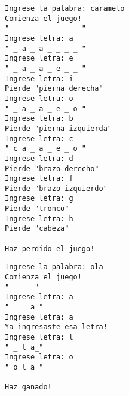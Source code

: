 \begin{lstlisting}
Ingrese la palabra: caramelo
Comienza el juego!
" _ _ _ _ _ _ _ _ "
Ingrese letra: a
" _ a _ a _ _ _ _ "
Ingrese letra: e
" _ a _ a _ e _ _ "
Ingrese letra: i
Pierde "pierna derecha"
Ingrese letra: o
" _ a _ a _ e _ o "
Ingrese letra: b
Pierde "pierna izquierda"
Ingrese letra: c
" c a _ a _ e _ o "
Ingrese letra: d
Pierde "brazo derecho"
Ingrese letra: f
Pierde "brazo izquierdo"
Ingrese letra: g
Pierde "tronco"
Ingrese letra: h
Pierde "cabeza"

Haz perdido el juego!
\end{lstlisting}

\begin{lstlisting}
Ingrese la palabra: ola
Comienza el juego!
" _ _ _"
Ingrese letra: a
" _ _ a_"
Ingrese letra: a
Ya ingresaste esa letra!
Ingrese letra: l
" _ l a_"
Ingrese letra: o
" o l a "

Haz ganado!
\end{lstlisting}

